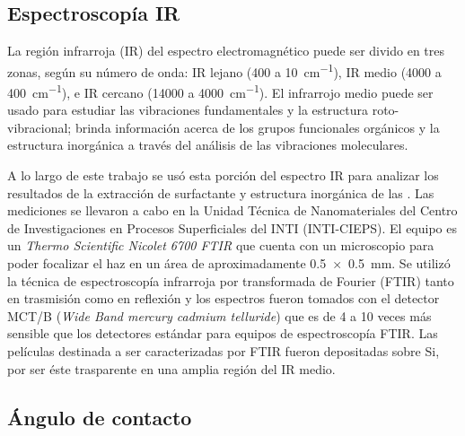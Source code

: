 	\subsection{Espectroscopía IR}\label{sec:IR}

		La región infrarroja (IR) del espectro electromagnético puede ser divido en tres zonas, según su número de onda: IR lejano (400 a \SI{10}{\cm^{-1}}), IR medio (4000 a \SI{400}{\cm^{-1}}), e IR cercano (14000 a \SI{4000}{\cm^{-1}}). El infrarrojo medio puede ser usado para estudiar las vibraciones fundamentales y la estructura roto-vibracional; brinda información acerca de los grupos funcionales orgánicos y la estructura inorgánica a través del análisis de las vibraciones moleculares.\cite{Atkins2006,Barrow1962,Stuart2004} 
		
		A lo largo de este trabajo se usó esta porción del espectro IR para analizar los resultados de la extracción de surfactante y estructura inorgánica de las \pdm. Las mediciones se llevaron a cabo en la Unidad Técnica de Nanomateriales del Centro de Investigaciones en Procesos Superficiales del INTI (INTI-CIEPS). El equipo es un \textit{Thermo Scientific Nicolet 6700 FTIR} que cuenta con un microscopio para poder focalizar el haz en un área de aproximadamente \SI{0.5x0.5}{\mm}. Se utilizó la técnica de espectroscopía infrarroja por transformada de Fourier (FTIR) tanto en trasmisión como en reflexión y los espectros fueron tomados con el detector MCT/B (\textit{Wide Band mercury cadmium telluride}) que es de 4 a 10 veces más sensible que los detectores estándar para equipos de espectroscopía FTIR.\cite{Nicholet2007} Las películas destinada a ser caracterizadas por FTIR fueron depositadas sobre Si, por ser éste trasparente en una amplia región del IR medio.

	\subsection{Ángulo de contacto}

